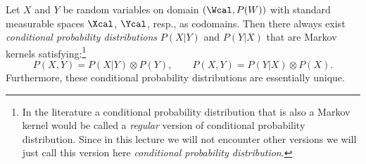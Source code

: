 \begin{Cor}
    \label{cor:reg-cond-prob-distr}
    Let $X$ and $Y$ be random variables on domain $(\Wcal,P(W))$ with standard measurable spaces $\Xcal$, $\Ycal$, resp., as codomains.
    Then there always exist \emph{conditional probability distributions} $P(X|Y)$ and $P(Y|X)$ that are Markov kernels satisfying:\footnote{In the literature a conditional probability distribution that is also a Markov kernel would be called a \emph{regular} version of conditional probability distribution. Since in this lecture we will not encounter other versions we will just call this version here \emph{conditional probability distribution}.}
    \[ P(X,Y) = P(X|Y) \otimes P(Y),\qquad P(X,Y) = P(Y|X) \otimes P(X).  \]
    Furthermore, these conditional probability distributions are essentially unique.
\end{Cor}


